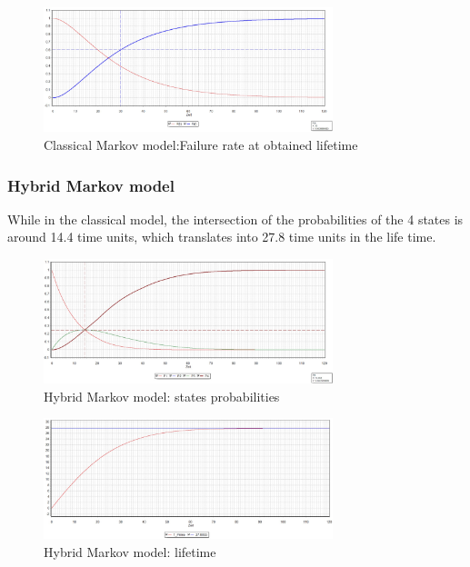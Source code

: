 \documentclass{article}
\begin{document}
\begin{doublespacing}
\begin{figure}[H] 
    \centering
    \includegraphics[width=0.75\textwidth]{Images/FSIdTL.JPG} 
    \caption{Classical Markov model:Failure rate at obtained lifetime} 
    \label{fig:FSCLT} 
\end{figure}



\subsubsection{Hybrid Markov model}

\par While in the classical model, the intersection of the probabilities of the 4 states is around 14.4 time units, which translates into 27.8 time units in the life time.

\begin{figure}[H] 
    \centering
    \includegraphics[width=0.75\textwidth]{Images/HybridStates.JPG} 
    \caption{Hybrid Markov model: states probabilities} 
    \label{fig:HybridStatesH} 
\end{figure}

\begin{figure}[H] 
    \centering
    \includegraphics[width=0.75\textwidth]{Images/HybridTimeLife.JPG} 
    \caption{Hybrid Markov model: lifetime} 
    \label{fig:HybridTimeLifeH} 
\end{figure}


\end{doublespacing}
\end{document}
